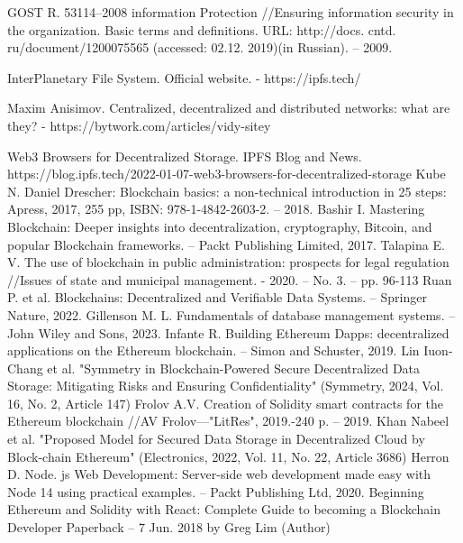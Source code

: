 \documentclass[10pt,conference,a4paper]{IEEEtran_EDM}
\begin{document}
\begin{thebibliography}{00}

 GOST R. 53114–2008 information Protection //Ensuring information security in the organization. Basic terms and definitions. URL: http://docs. cntd. ru/document/1200075565 (accessed: 02.12. 2019)(in Russian). – 2009.

 InterPlanetary File System. Official website. - https://ipfs.tech/

 Maxim Anisimov. Centralized, decentralized and distributed networks: what are they? - https://bytwork.com/articles/vidy-sitey

 Web3 Browsers for Decentralized Storage. IPFS Blog and News. https://blog.ipfs.tech/2022-01-07-web3-browsers-for-decentralized-storage
 Kube N. Daniel Drescher: Blockchain basics: a non-technical introduction in 25 steps: Apress, 2017, 255 pp, ISBN: 978-1-4842-2603-2. – 2018.
 Bashir I. Mastering Blockchain: Deeper insights into decentralization, cryptography, Bitcoin, and popular Blockchain frameworks. – Packt Publishing Limited, 2017.
 Talapina E. V. The use of blockchain in public administration: prospects for legal regulation //Issues of state and municipal management. - 2020. – No. 3. – pp. 96-113
 Ruan P. et al. Blockchains: Decentralized and Verifiable Data Systems. – Springer Nature, 2022.
 Gillenson M. L. Fundamentals of database management systems. – John Wiley and Sons, 2023.
 Infante R. Building Ethereum Dapps: decentralized applications on the Ethereum blockchain. – Simon and Schuster, 2019.
 Lin Iuon-Chang et al. "Symmetry in Blockchain-Powered Secure Decentralized Data Storage: Mitigating Risks and Ensuring Confidentiality" (Symmetry, 2024, Vol. 16, No. 2, Article 147) 
 Frolov A.V. Creation of Solidity smart contracts for the Ethereum blockchain //AV Frolov—"LitRes", 2019.-240 p. – 2019.
 Khan Nabeel et al. "Proposed Model for Secured Data Storage in Decentralized Cloud by Block-chain Ethereum" (Electronics, 2022, Vol. 11, No. 22, Article 3686)  
 Herron D. Node. js Web Development: Server-side web development made easy with Node 14 using practical examples. – Packt Publishing Ltd, 2020.
 Beginning Ethereum and Solidity with React: Complete Guide to becoming a Blockchain Developer Paperback – 7 Jun. 2018 by Greg Lim (Author)


\end{thebibliography}
\end{document}
